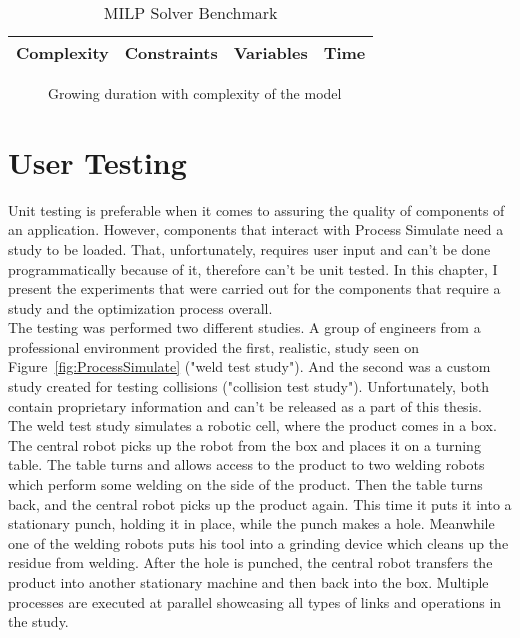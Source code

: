 \begin{table}[h]
    \centering
    \begin{tabular}{|c|c|c|c|}
        \hline
        Complexity & Constraints & Variables & Time \\
        \hline
        
        \hline
    \end{tabular}
    \caption{MILP Solver Benchmark}
    \label{tbl:MILPBenchmark}
\end{table}

\begin{figure}[H]
	\centering
	
	\caption{Growing duration with complexity of the model}
	\label{fig:MILPBenchmark}
\end{figure}


\section{User Testing}

Unit testing is preferable when it comes to assuring the quality of components of an application.
However, components that interact with Process Simulate need a study to be loaded. 
That, unfortunately, requires user input and can't be done programmatically because of it, therefore can't be unit tested.
In this chapter, I present the experiments that were carried out for the components that require a study and the optimization process overall.  \\

The testing was performed two different studies. 
A group of engineers from a professional environment provided the first, realistic, study seen on Figure~\ref{fig:ProcessSimulate} ("weld test study").
And the second was a custom study created for testing collisions ("collision test study").
Unfortunately, both contain proprietary information and can't be released as a part of this thesis. \\

The weld test study simulates a robotic cell, where the product comes in a box.
The central robot picks up the robot from the box and places it on a turning table.
The table turns and allows access to the product to two welding robots which perform some welding on the side of the product. 
Then the table turns back, and the central robot picks up the product again. 
This time it puts it into a stationary punch, holding it in place, while the punch makes a hole.
Meanwhile one of the welding robots puts his tool into a grinding device which cleans up the residue from welding.
After the hole is punched, the central robot transfers the product into another stationary machine and then back into the box.
Multiple processes are executed at parallel showcasing all types of links and operations in the study. \\

